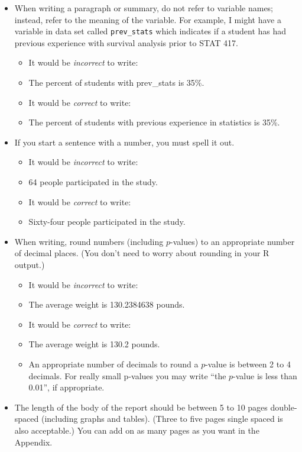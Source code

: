 \documentclass[letterpaper,12pt]{report}
\begin{document}
{}
\begin{itemize}
       \item When writing a paragraph or summary, do not refer to variable names; instead, refer to the meaning of the variable.  For example, I might have a variable in data set called \texttt{prev\_stats} which indicates if a student has had previous experience with survival analysis prior to STAT 417.
    \begin{itemize}
        \item It would be \emph{incorrect} to write:
        \item[] The percent of students with prev\_stats is 35\%.
        \item It would be \emph{correct} to write:
        \item[] The percent of students with previous experience in statistics is 35\%.
    \end{itemize}
    \item If you start a sentence with a number, you must spell it out.
            \begin{itemize}
        \item It would be \emph{incorrect} to write:
        \item[] 64 people participated in the study.
        \item It would be \emph{correct} to write:
        \item[] Sixty-four people participated in the study.
    \end{itemize}
    \item When writing, round numbers (including $p$-values) to an appropriate number of decimal places.  (You don't need to worry about rounding in your R output.)
        \begin{itemize}
        \item It would be \emph{incorrect} to write:
        \item[] The average weight is 130.2384638 pounds.
        \item It would be \emph{correct} to write:
        \item[] The average weight is 130.2 pounds.
        \item An appropriate number of decimals to round a $p$-value is between 2 to 4 decimals.  For really small p-values you may write ``the $p$-value is less than 0.01'', if appropriate.
    \end{itemize}
    \item The length of the body of the report should be between 5 to 10 pages double-spaced (including graphs and tables). (Three to five pages single spaced is also acceptable.)  You can add on as many pages as you want in the Appendix.

\end{itemize}
\end{document}
